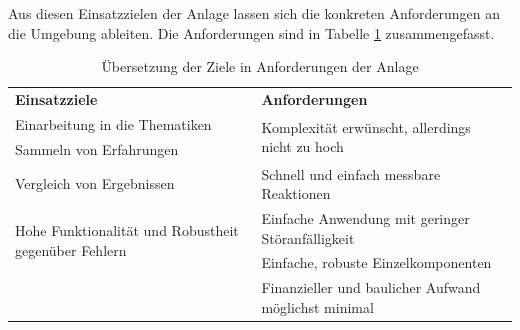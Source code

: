Aus diesen Einsatzzielen der Anlage lassen sich die konkreten Anforderungen an die Umgebung ableiten. Die Anforderungen sind in Tabelle \ref{tab:anforderungen_umgebung} zusammengefasst.

\begin{table}[H]
\centering
\small
\renewcommand{\arraystretch}{1.3}
\begin{tabularx}{1\textwidth}{m{}m{}}

\toprule

\textbf{Einsatzziele} & \textbf{Anforderungen} \\

\cmidrule[0.5pt](r{0.25em}){1-1} 
\cmidrule[0.5pt](l{0.25em}){2-2}

Einarbeitung in die Thematiken	& \multirow{2}{\hsize}{Komplexität erwünscht, allerdings nicht zu hoch}  \\

\cmidrule[0.1pt](lr{2em}){1-1} 

Sammeln von Erfahrungen							&					\\

\cmidrule[0.5pt](r{0.25em}){1-1} 
\cmidrule[0.5pt](l{0.25em}){2-2}

Vergleich von Ergebnissen		& Schnell und einfach messbare Reaktionen      \\
\cmidrule[0.5pt](r{0.25em}){1-1} 
\cmidrule[0.5pt](l{0.25em}){2-2}

\multirow{2}{\hsize}{Hohe Funktionalität und Robustheit gegenüber Fehlern} & Einfache Anwendung mit geringer Störanfälligkeit\\
\cmidrule[0.1pt](lr{2em}){2-2} 

 & Einfache, robuste Einzelkomponenten \\
 
\cmidrule[0.5pt](r{0.25em}){1-1} 
\cmidrule[0.5pt](l{0.25em}){2-2}

 & Finanzieller und baulicher Aufwand möglichst minimal \\

\bottomrule
\end{tabularx}
\caption{Übersetzung der Ziele in Anforderungen der Anlage}
\label{tab:anforderungen_umgebung}
\end{table}

